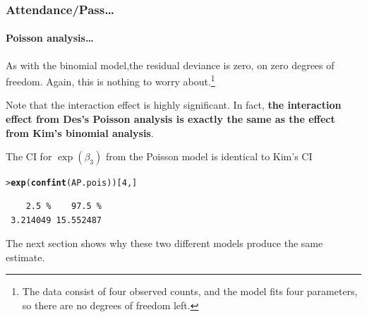 \documentclass{beamer}\usepackage[]{graphicx}\usepackage[]{xcolor}
\makeatletter
\newcommand{\hlnum}[1]{\textcolor[rgb]{0.686,0.059,0.569}{#1}}%
\newcommand{\hlstd}[1]{\textcolor[rgb]{0.345,0.345,0.345}{#1}}%
\newcommand{\hlkwd}[1]{\textcolor[rgb]{0.737,0.353,0.396}{\textbf{#1}}}%
\newenvironment{kframe}{%
 \def\at@end@of@kframe{}%
 \ifinner\ifhmode%
  \def\at@end@of@kframe{\end{minipage}}%
  \begin{minipage}{\columnwidth}%
 \fi\fi%
 \def\FrameCommand##1{\hskip\@totalleftmargin \hskip-\fboxsep
 \colorbox{shadecolor}{##1}\hskip-\fboxsep
     \hskip-\linewidth \hskip-\@totalleftmargin \hskip\columnwidth}%
 \MakeFramed {\advance\hsize-\width
   \@totalleftmargin\z@ \linewidth\hsize
   \@setminipage}}%
 {\par\unskip\endMakeFramed%
 \at@end@of@kframe}
\newenvironment{knitrout}{}{} %
\makeatother
\begin{document}
\begin{frame}[fragile]
\frametitle{Attendance/Pass\ldots}
\framesubtitle{Poisson analysis\ldots}
As with the binomial model,the residual deviance is zero, on zero degrees of freedom. Again, this is nothing to worry about.\footnote{The data consist of four observed counts, and the model fits four parameters, so there are no degrees of freedom left.}
\medskip

Note that the interaction effect is highly significant.
In fact, {\bf the  interaction effect from Des's Poisson analysis is exactly the same as the  effect from Kim's binomial analysis}.  
\bigskip 

The CI for $\exp(\beta_3)$ from the Poisson model is identical to Kim's CI
\medskip

\begin{knitrout}\scriptsize
{}\color{fgcolor}\begin{kframe}
\begin{alltt}
\hlstd{> }\hlkwd{exp}\hlstd{(}\hlkwd{confint}\hlstd{(AP.pois))[}\hlnum{4}\hlstd{,]}
\end{alltt}


{\ttfamily\noindent\itshape\color{messagecolor}{Waiting for profiling to be done...}}\begin{verbatim}
    2.5 %    97.5 % 
 3.214049 15.552487 
\end{verbatim}
\end{kframe}
\end{knitrout}
\medskip

The next section shows why these two different models produce the same estimate.

\end{frame}



\end{document}
